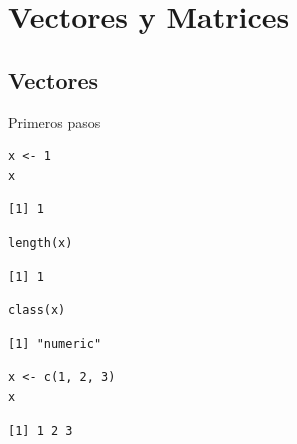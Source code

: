 \documentclass[xcolor={usenames,svgnames,dvipsnames}]{beamer}
\begin{document}
\section{Vectores y Matrices}
\label{sec-2}

\subsection{Vectores}
\label{sec-2-1}

\begin{frame}[fragile,label=sec-2-1-1]{Primeros pasos}
 \lstset{language=R,label= ,caption= ,numbers=none}
\begin{lstlisting}
x <- 1
x
\end{lstlisting}

\begin{verbatim}
[1] 1
\end{verbatim}

\lstset{language=R,label= ,caption= ,numbers=none}
\begin{lstlisting}
length(x)
\end{lstlisting}

\begin{verbatim}
[1] 1
\end{verbatim}

\lstset{language=R,label= ,caption= ,numbers=none}
\begin{lstlisting}
class(x)
\end{lstlisting}

\begin{verbatim}
[1] "numeric"
\end{verbatim}

\lstset{language=R,label= ,caption= ,numbers=none}
\begin{lstlisting}
x <- c(1, 2, 3)
x
\end{lstlisting}

\begin{verbatim}
[1] 1 2 3
\end{verbatim}
\end{frame}
\end{document}
